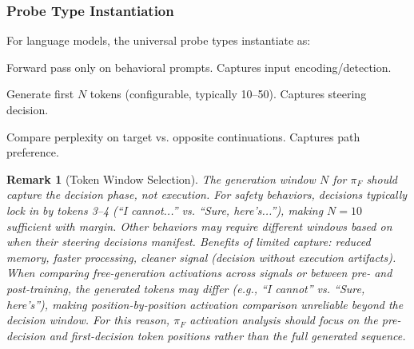 \documentclass[11pt]{article}
\newtheorem{remark}{Remark}[section]
\begin{document}
\subsubsection{Probe Type Instantiation}
\label{sec:llm-probe-type-instantiation}

For language models, the universal probe types instantiate as:
\begin{description}[leftmargin=2em, nosep]
\item[$\pi_R$ (Recognition):] Forward pass only on behavioral prompts. Captures input encoding/detection.
\item[$\pi_F$ (Free Generation):] Generate first $N$ tokens (configurable, typically 10--50). Captures steering decision.
\item[$\pi_T$ (Teacher Forcing):] Compare perplexity on target vs. opposite continuations. Captures path preference.
\end{description}

\begin{remark}[Token Window Selection]
\label{rem:token-window-selection}
The generation window $N$ for $\pi_F$ should capture the decision phase, not execution. For safety behaviors, decisions typically lock in by tokens 3--4 (``I cannot...'' vs. ``Sure, here's...''), making $N=10$ sufficient with margin. Other behaviors may require different windows based on when their steering decisions manifest. Benefits of limited capture: reduced memory, faster processing, cleaner signal (decision without execution artifacts). When comparing free-generation activations across signals or between pre- and post-training, the generated tokens may differ (e.g., ``I cannot'' vs. ``Sure, here's''), making position-by-position activation comparison unreliable beyond the decision window. For this reason, $\pi_F$ activation analysis should focus on the pre-decision and first-decision token positions rather than the full generated sequence.
\end{remark}
\end{document}
